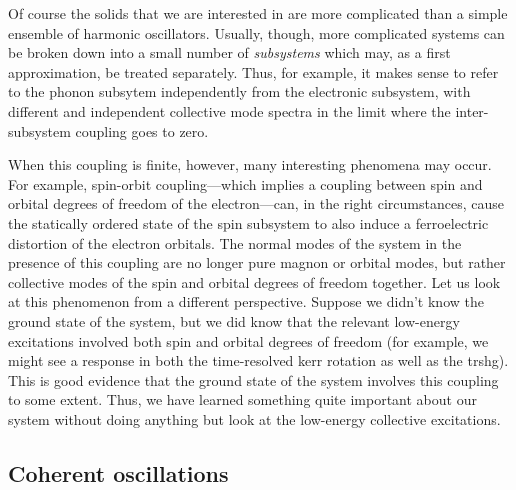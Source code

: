 Of course the solids that we are interested in are more complicated than a simple ensemble of harmonic oscillators.
Usually, though, more complicated systems can be broken down into a small number of \emph{subsystems} which may, as a first approximation, be treated separately.
Thus, for example, it makes sense to refer to the phonon subsytem independently from the electronic subsystem, with different and independent collective mode spectra in the limit where the inter-subsystem coupling goes to zero.

When this coupling is finite, however, many interesting phenomena may occur.
For example, spin-orbit coupling---which implies a coupling between spin and orbital degrees of freedom of the electron---can, in the right circumstances, cause the statically ordered state of the spin subsystem to also induce a ferroelectric distortion of the electron orbitals.
The normal modes of the system in the presence of this coupling are no longer pure magnon or orbital modes, but rather collective modes of the spin and orbital degrees of freedom together.
Let us look at this phenomenon from a different perspective.
Suppose we didn't know the ground state of the system, but we did know that the relevant low-energy excitations involved both spin and orbital degrees of freedom (for example, we might see a response in both the time-resolved kerr rotation as well as the \gls{trshg}).
This is good evidence that the ground state of the system involves this coupling to some extent.
Thus, we have learned something quite important about our system without doing anything but look at the low-energy collective excitations.

\subsection{Coherent oscillations}\label{sec:coherentoscillations}

